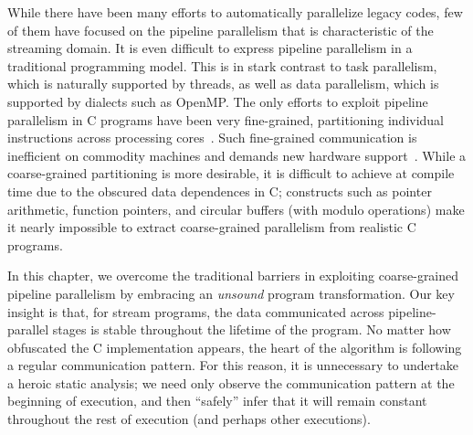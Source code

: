 While there have been many efforts to automatically parallelize legacy
codes, few of them have focused on the pipeline parallelism that is
characteristic of the streaming domain.  It is even difficult to
express pipeline parallelism in a traditional programming model.  This
is in stark contrast to task parallelism, which is naturally supported
by threads, as well as data parallelism, which is supported by
dialects such as OpenMP.  The only efforts to exploit pipeline
parallelism in C programs have been very fine-grained, partitioning
individual instructions across processing
cores~\cite{ottoni05decoupled}.  Such fine-grained communication is
inefficient on commodity machines and demands new hardware
support~\cite{rangan04array,ottoni05decoupled}.  While a
coarse-grained partitioning is more desirable, it is difficult to
achieve at compile time due to the obscured data dependences in C;
constructs such as pointer arithmetic, function pointers, and circular
buffers (with modulo operations) make it nearly impossible to extract
coarse-grained parallelism from realistic C programs.



In this chapter, we overcome the traditional barriers in exploiting
coarse-grained pipeline parallelism by embracing an {\it unsound}
program transformation.  Our key insight is that, for stream programs,
the data communicated across pipeline-parallel stages is stable
throughout the lifetime of the program.  No matter how obfuscated the
C implementation appears, the heart of the algorithm is following a
regular communication pattern.  For this reason, it is unnecessary to
undertake a heroic static analysis; we need only observe the
communication pattern at the beginning of execution, and then
``safely'' infer that it will remain constant throughout the rest of
execution (and perhaps other executions).

